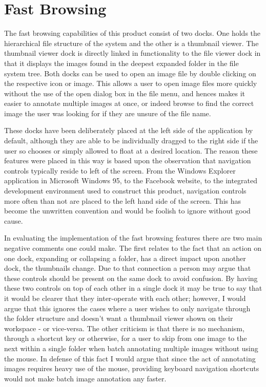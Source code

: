 \section{Fast Browsing}
The fast browsing capabilities of this product consist of two docks.  One holds the hierarchical file structure of the system and the other is a thumbnail viewer.  The thumbnail viewer dock is directly linked in functionality to the file viewer dock in that it displays the images found in the deepest expanded folder in the file system tree.  Both docks can be used to open an image file by double clicking on the respective icon or image.  This allows a user to open image files more quickly without the use of the open dialog box in the file menu, and hences makes it easier to annotate multiple images at once, or indeed browse to find the correct image the user was looking for if they are unsure of the file name.

These docks have been deliberately placed at the left side of the application by default, although they are able to be individually dragged to the right side if the user so chooses or simply allowed to float at a desired location.  The reason these features were placed in this way is based upon the observation that navigation controls typically reside to left of the screen.  From the Windows Explorer application in Microsoft Windows 95, to the Facebook website, to the integrated development environment used to construct this product, navigation controls more often than not are placed to the left hand side of the screen.  This has become the unwritten convention and would be foolish to ignore without good cause.

In evaluating the implementation of the fast browsing features there are two main negative comments one could make.  The first relates to the fact that an action on one dock, expanding or collapsing a folder, has a direct impact upon another dock, the thumbnails change.  Due to that connection a person may argue that these controls should be present on the same dock to avoid confusion.  By having these two controls on top of each other in a single dock it may be true to say that it would be clearer that they inter-operate with each other; however, I would argue that this ignores the cases where a user wishes to only navigate through the folder structure and doesn’t want a thumbnail viewer shown on their workspace - or vice-versa.  The other criticism is that there is no mechanism, through a shortcut key or otherwise, for a user to skip from one image to the next within a single folder when batch annotating multiple images without using the mouse.  In defense of this fact I would argue that since the act of annotating images requires heavy use of the mouse, providing keyboard navigation shortcuts would not make batch image annotation any faster.
